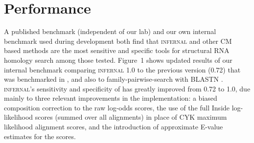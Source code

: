 
\section{Performance}


A published benchmark (independent of our lab) \citep{Freyhult07} and
our own internal benchmark used during development
\citep{NawrockiEddy07} both find that \textsc{infernal} and other CM
based methods are the most sensitive and specific tools for structural
RNA homology search among those tested. Figure~1 shows
updated results of our internal benchmark comparing \textsc{infernal}
1.0 to the previous version (0.72) that was benchmarked in
\citet{Freyhult07}, and also to family-pairwise-search with BLASTN
\citep{Altschul97,Grundy98b}.  \textsc{infernal}'s sensitivity and
specificity of has greatly improved from 0.72 to 1.0, due mainly to 
three relevant improvements in the implementation: a biased
composition correction to the raw log-odds scores, the use of the full
Inside log-likelihood scores (summed over all alignments) in place of
CYK maximum likelihood alignment scores, and the introduction of
approximate E-value estimates for the scores.

